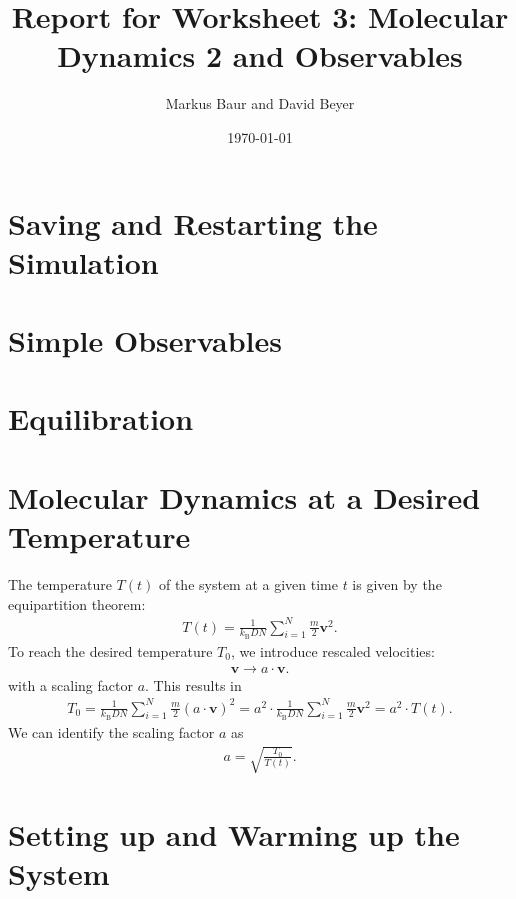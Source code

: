 \documentclass[a4paper,10pt,bibtotoc]{scrartcl}
\begin{document}
\titlehead{Simulation Methods in Physics I \hfill WS 2019/2010}
\title{Report for Worksheet 3: Molecular Dynamics 2 and Observables}
\author{Markus Baur and David Beyer}
\date{\today}
\maketitle

\tableofcontents

\section{Saving and Restarting the Simulation}
\section{Simple Observables}
\section{Equilibration}
\section{Molecular Dynamics at a Desired Temperature}
The temperature $T(t)$ of the system at a given time $t$ is given by the equipartition theorem:
\begin{align}
T(t) = \frac{1}{k_\mathrm{B}DN}\sum_{i=1}^{N}\frac{m}{2}\mathbf{v}^2.
\end{align}
To reach the desired temperature $T_0$, we introduce rescaled velocities:
\begin{align}
\mathbf{v}\rightarrow a\cdot\mathbf{v}.
\end{align}
with a scaling factor $a$. 
This results in
\begin{align}
T_0 = \frac{1}{k_\mathrm{B}DN}\sum_{i=1}^{N}\frac{m}{2}\left(a\cdot\mathbf{v}\right)^2 =a^2\cdot \frac{1}{k_\mathrm{B}DN}\sum_{i=1}^{N}\frac{m}{2}\mathbf{v}^2 = a^2\cdot T(t).
\end{align}
We can identify the scaling factor $a$ as
\begin{align}
a = \sqrt{\frac{T_0}{T(t)}}.
\end{align}





\section{Setting up and Warming up the System}
\end{document}
